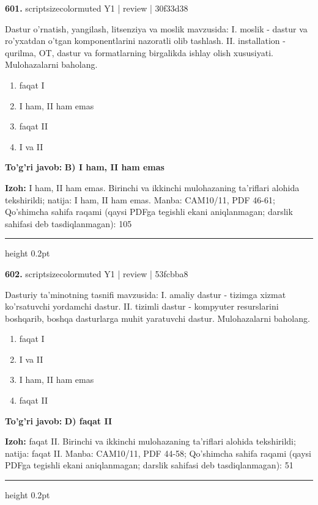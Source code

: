 \documentclass[10pt,a4paper]{article}
\begin{document}
{\bfseries\sffamily\color{ink} 601.} {scriptsizecolor{muted} Y1 | review | 30f33d38}
\par
Dastur o'rnatish, yangilash, litsenziya va moslik mavzusida: I. moslik - dastur va ro'yxatdan o'tgan komponentlarini nazoratli olib tashlash. II. installation - qurilma, OT, dastur va formatlarning birgalikda ishlay olish xususiyati. Mulohazalarni baholang.
\begin{enumerate}[label=\Alph*),leftmargin=9mm]
\item faqat I
\item I ham, II ham emas
\item faqat II
\item I va II
\end{enumerate}
\begin{tcolorbox}[enhanced,breakable,colback=teal!4,colframe=teal!60!black,boxrule=0.45pt,arc=1.2mm,left=2.7mm,right=2.7mm,top=1.8mm,bottom=1.8mm,before skip=2mm,after skip=2mm]
{\bfseries\sffamily\color{teal}To'g'ri javob:} \textbf{B) I ham, II ham emas}
\par\smallskip
{\bfseries Izoh:} I ham, II ham emas. Birinchi va ikkinchi mulohazaning ta'riflari alohida tekshirildi; natija: I ham, II ham emas. Manba: CAM10/11, PDF 46-61; Qo'shimcha sahifa raqami (qaysi PDFga tegishli ekani aniqlanmagan; darslik sahifasi deb tasdiqlanmagan): 105
\end{tcolorbox}
\vspace{2mm}\hrule height 0.2pt\vspace{3mm}

{\bfseries\sffamily\color{ink} 602.} {scriptsizecolor{muted} Y1 | review | 53fcbba8}
\par
Dasturiy ta'minotning tasnifi mavzusida: I. amaliy dastur - tizimga xizmat ko'rsatuvchi yordamchi dastur. II. tizimli dastur - kompyuter resurslarini boshqarib, boshqa dasturlarga muhit yaratuvchi dastur. Mulohazalarni baholang.
\begin{enumerate}[label=\Alph*),leftmargin=9mm]
\item faqat I
\item I va II
\item I ham, II ham emas
\item faqat II
\end{enumerate}
\begin{tcolorbox}[enhanced,breakable,colback=teal!4,colframe=teal!60!black,boxrule=0.45pt,arc=1.2mm,left=2.7mm,right=2.7mm,top=1.8mm,bottom=1.8mm,before skip=2mm,after skip=2mm]
{\bfseries\sffamily\color{teal}To'g'ri javob:} \textbf{D) faqat II}
\par\smallskip
{\bfseries Izoh:} faqat II. Birinchi va ikkinchi mulohazaning ta'riflari alohida tekshirildi; natija: faqat II. Manba: CAM10/11, PDF 44-58; Qo'shimcha sahifa raqami (qaysi PDFga tegishli ekani aniqlanmagan; darslik sahifasi deb tasdiqlanmagan): 51
\end{tcolorbox}
\vspace{2mm}\hrule height 0.2pt\vspace{3mm}
\end{document}
